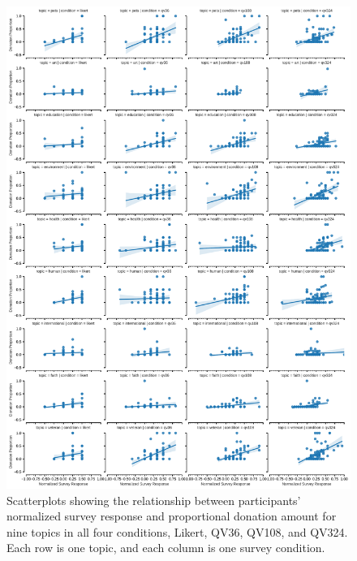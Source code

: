 \begin{figure}[htpb]
    \centering
    \includegraphics[width=\textwidth, keepaspectratio=true]{content/image/vote_donation_covariates.pdf}
    \caption{
      Scatterplots showing the relationship between participants' normalized survey response and proportional donation amount for nine topics in all four conditions, Likert, QV36, QV108, and QV324. Each row is one topic, and each column is one survey condition.
    }
    \label{fig:topic_covariate_exp1}
\end{figure}


